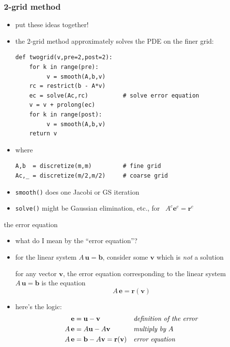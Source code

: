 \documentclass[10pt,
               svgnames,
               hyperref={colorlinks,citecolor=DeepPink4,linkcolor=FireBrick,urlcolor=Maroon},
               usepdftitle=false]{beamer}
\newcommand{\bb}{\mathbf{b}}
\newcommand{\be}{\mathbf{e}}
\newcommand{\br}{\mathbf{r}}
\newcommand{\bu}{\mathbf{u}}
\newcommand{\bv}{\mathbf{v}}
\begin{document}
\begin{frame}[fragile]
\frametitle{2-grid method}
\begin{itemize}
\item put these ideas together!
\item the \alert{2-grid method} approximately solves the PDE on the finer grid:

\bigskip
\begin{verbatim}
def twogrid(v,pre=2,post=2):
    for k in range(pre):
         v = smooth(A,b,v)
    rc = restrict(b - A*v)
    ec = solve(Ac,rc)          # solve error equation
    v = v + prolong(ec)
    for k in range(post):
         v = smooth(A,b,v)
    return v
\end{verbatim}

\medskip
\item where
\begin{verbatim}
A,b  = discretize(m,m)         # fine grid
Ac,_ = discretize(m/2,m/2)     # coarse grid
\end{verbatim}
\item \texttt{smooth()} does one Jacobi or GS iteration
\item \texttt{solve()} might be Gaussian elimination, etc., for \, $A^c \be^c = \br^c$
\end{itemize}
\end{frame}


\begin{frame}{the error equation}
\begin{itemize}
\item what do I mean by the ``error equation''?
\item for the linear system $A\,\bu=\bb$, consider some $\bv$ which is \emph{not} a solution

\begin{definition}
for any vector $\bv$, the \alert{error equation} corresponding to the linear system $A\,\bu = \bb$ is the equation
	$$A\,\be = \br(\bv)$$
\end{definition}

\item here's the logic:
\begin{align*}
    \be &= \bu - \bv                   &&\text{\emph{definition of the error}}\\
    A\, \be &= A \bu - A \bv           &&\text{\emph{multiply by $A$}}\\
    A\, \be &= \bb - A \bv = \br(\bv)  &&\text{\emph{error equation}}
\end{align*}
\end{itemize}
\end{frame}
\end{document}
